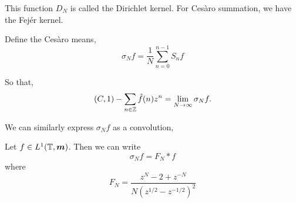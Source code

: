 \documentclass{owmaths}
\begin{document}
This function $D_N$ is called the Dirichlet kernel. For Ces\`aro summation,
we have the Fej\'er kernel.

Define the Ces\`aro means,
\begin{equation*}
    \sigma_N f = \frac{1}{N} \sum_{n=0}^{n-1} S_n f
\end{equation*}

So that,
\begin{equation*}
    (C,1)-\sum_{n\in \mathbb{Z}} \hat{f}(n) z^n = \lim_{N\rightarrow\infty} \sigma_N f.
\end{equation*}

We can similarly express $\sigma_N f$ as a convolution,
\begin{proposition}
    Let $f \in L^1(\mathbb{T},\boldsymbol{m})$. Then we can write
    \begin{equation*}
        \sigma_N f = F_N * f
    \end{equation*}
    where
    \begin{equation*}
        F_N = \frac{z^{N}-2+z^{-N}}{N(z^{1/2}-z^{-1/2})^2}
    \end{equation*}
\end{proposition}
\end{document}
